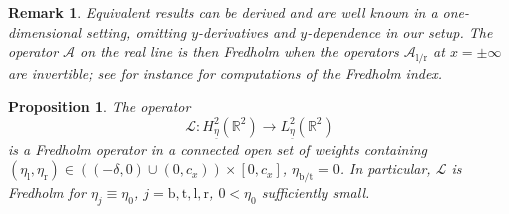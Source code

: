 \documentclass[10pt]{article}
\newtheorem{Proposition}[Lemma]{Proposition}
\newtheorem{Remark}[Lemma]{Remark}
\newcommand{\R}{\mathbb{R}}
\begin{document}
\begin{Remark}\label{r:1d}
Equivalent results can be derived and are well known in a one-dimensional setting, omitting $y$-derivatives and $y$-dependence in our setup. The operator $\mathcal{A}$  on the real line is then Fredholm when the operators $\mathcal{A}_\mathrm{l/r}$ at $x=\pm\infty$ are invertible; see for instance \cite{palmer,Salamon,ssmorse} for computations of the Fredholm index. 
\end{Remark}


%
\begin{Proposition}\label{Fredholm_properties:range_of_parameters:2D} The operator 
%
$$\mathscr{L}: H_{\underline{\eta}}^2(\R^2) \to L_{\underline{\eta}}^2(\R^2)$$
is a Fredholm operator in a connected  open set of weights containing $(\eta_\mathrm{l}, \eta_\mathrm{r}) \in \left((-\delta,0)\cup(0,c_x)\right)\times [0,c_x]$, $\eta_\mathrm{b/t}=0$. In particular, $\mathscr{L}$ is Fredholm for $\eta_j\equiv\eta_0$, $j=\mathrm{b,t,l,r}$, $0<\eta_0$ sufficiently small. 
\end{Proposition}
\end{document}
